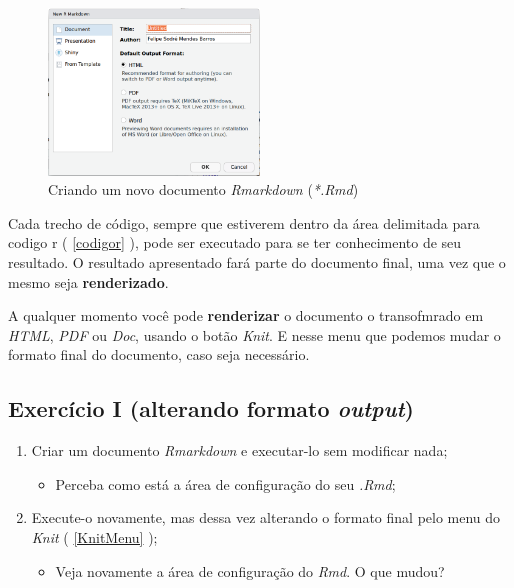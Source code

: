\documentclass[]{book}
\providecommand{\tightlist}{%
  \setlength{\itemsep}{0pt}\setlength{\parskip}{0pt}}
\begin{document}
\begin{figure}
\centering
\includegraphics[width=0.5\textwidth,height=\textheight]{./img/TipoDoc.png}
\caption{Criando um novo documento \emph{Rmarkdown} (\emph{*.Rmd}) \label{NewDoc}}
\end{figure}

Cada trecho de código, sempre que estiverem dentro da área delimitada para codigo r ( \autoref{codigor} ), pode ser executado para se ter conhecimento de seu resultado. O resultado apresentado fará parte do documento final, uma vez que o mesmo seja \textbf{renderizado}.

A qualquer momento você pode \textbf{renderizar} o documento o transofmrado em \emph{HTML}, \emph{PDF} ou \emph{Doc}, usando o botão \emph{Knit}. E nesse menu que podemos mudar o formato final do documento, caso seja necessário.

\hypertarget{ExI}{%
\subsection{\texorpdfstring{Exercício I (alterando formato \emph{output})}{Exercício I (alterando formato output)}}\label{ExI}}

\begin{enumerate}
\def\labelenumi{\arabic{enumi}.}
\tightlist
\item
  Criar um documento \emph{Rmarkdown} e executar-lo sem modificar nada;

  \begin{itemize}
  \tightlist
  \item
    Perceba como está a área de configuração do seu \emph{.Rmd};\\
  \end{itemize}
\item
  Execute-o novamente, mas dessa vez alterando o formato final pelo menu do \emph{Knit} ( \autoref{KnitMenu} );

  \begin{itemize}
  \tightlist
  \item
    Veja novamente a área de configuração do \emph{Rmd}. O que mudou?
  \end{itemize}
\end{enumerate}
\end{document}
